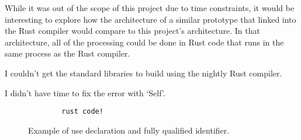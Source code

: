 \documentclass[11pt]{article}
\begin{document}
While it was out of the scope of this project due to time constraints, it would be interesting to explore how the architecture of a similar prototype that linked into the Rust compiler would compare to this project's architecture.
In that architecture, all of the processing could be done in Rust code that runs in the same process as the Rust compiler.

I couldn't get the standard libraries to build using the nightly Rust compiler.

I didn't have time to fix the error with `Self'.

\begin{figure}
    \caption{Example of use declaration and fully qualified identifier.}
    \label{fig:qualifiers}
    \begin{lstlisting}
        rust code!
    \end{lstlisting}
\end{figure}
\end{document}
